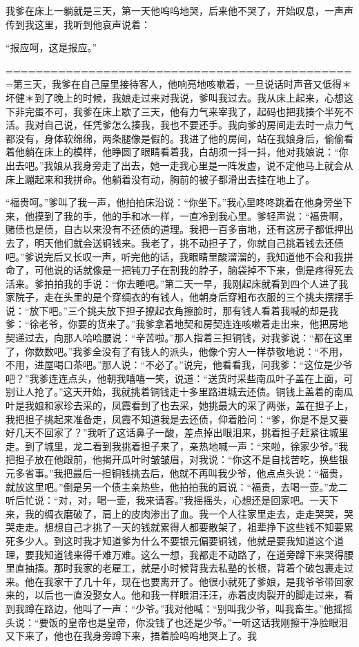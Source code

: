 \documentclass[12pt,UTF8]{ctexbook}
\begin{document}
我爹在床上一躺就是三天，第一天他呜呜地哭，后来他不哭了，开始叹息，一声声传到我这里，我听到他哀声说着：

“报应呵，这是报应。”

===============================================第三天，我爹在自己屋里接待客人，他响亮地咳嗽着，一旦说话时声音又低得＊坏健＊到了晚上的时候，我娘走过来对我说，爹叫我过去。我从床上起来，心想这下非完蛋不可，我爹在床上歇了三天，他有力气来宰我了，起码也把我揍个半死不活。我对自己说，任凭爹怎么揍我，我也不要还手。我向爹的房间走去时一点力气都没有，身体软绵绵，两条腿像是假的。我进了他的房间，站在我娘身后，偷偷看着他躺在床上的模样，他睁圆了眼睛看着我，白胡须一抖一抖，他对我娘说：“你出去吧。”我娘从我身旁走了出去，她一走我心里是一阵发虚，说不定他马上就会从床上蹦起来和我拼命。他躺着没有动，胸前的被子都滑出去挂在地上了。

“福贵呵。”爹叫了我一声，他拍拍床沿说：“你坐下。”我心里咚咚跳着在他身旁坐下来，他摸到了我的手，他的手和冰一样，一直冷到我心里。爹轻声说：“福贵啊，赌债也是债，自古以来没有不还债的道理。我把一百多亩地，还有这房子都低押出去了，明天他们就会送铜钱来。我老了，挑不动担子了，你就自己挑着钱去还债吧。”爹说完后又长叹一声，听完他的话，我眼睛里酸溜溜的，我知道他不会和我拼命了，可他说的话就像是一把钝刀子在割我的脖子，脑袋掉不下来，倒是疼得死去活来。爹拍拍我的手说：“你去睡吧。”第二天一早，我刚起床就看到四个人进了我家院子，走在头里的是个穿绸衣的有钱人，他朝身后穿粗布衣服的三个挑夫摆摆手说：“放下吧。”三个挑夫放下担子撩起衣角擦脸时，那有钱人看着我喊的却是我爹：“徐老爷，你要的货来了。”我爹拿着地契和房契连连咳嗽着走出来，他把房地契递过去，向那人哈哈腰说：“辛苦啦。”那人指着三担铜钱，对我爹说：“都在这里了，你数数吧。”我爹全没有了有钱人的派头，他像个穷人一样恭敬地说：“不用，不用，进屋喝口茶吧。”那人说：“不必了。”说完，他看看我，问我爹：“这位是少爷吧？”我爹连连点头，他朝我嘻嘻一笑，说道：“送货时采些南瓜叶子盖在上面，可别让人抢了。”这天开始，我就挑着铜钱走十多里路进城去还债。铜钱上盖着的南瓜叶是我娘和家珍去采的，凤霞看到了也去采，她挑最大的采了两张，盖在担子上，我把担子挑起来准备走，凤霞不知道我是去还债，仰着脸问：“爹，你是不是又要好几天不回家了？”我听了这话鼻子一酸，差点掉出眼泪来，挑着担子赶紧往城里走。到了城里，龙二看到我挑着担子来了，亲热地喊一声：“来啦，徐家少爷。”我把担子放在他跟前，他揭开瓜叶时皱皱眉，对我说：“你这不是自找苦吃，换些银元多省事。”我把最后一担铜钱挑去后，他就不再叫我少爷，他点点头说：“福贵，就放这里吧。”倒是另一个债主亲热些，他拍拍我的肩说：“福贵，去喝一壶。”龙二听后忙说：“对，对，喝一壶，我来请客。”我摇摇头，心想还是回家吧。一天下来，我的绸衣磨破了，肩上的皮肉渗出了血。我一个人往家里走去，走走哭哭，哭哭走走。想想自己才挑了一天的钱就累得人都要散架了，祖辈挣下这些钱不知要累死多少人。到这时我才知道爹为什么不要银元偏要铜钱，他就是要我知道这个道理，要我知道钱来得千难万难。这么一想，我都走不动路了，在道旁蹲下来哭得腰里直抽搐。那时我家的老雇工，就是小时候背我去私塾的长根，背着个破包裹走过来。他在我家干了几十年，现在也要离开了。他很小就死了爹娘，是我爷爷带回家来的，以后也一直没娶女人。他和我一样眼泪汪汪，赤着皮肉裂开的脚走过来，看到我蹲在路边，他叫了一声：“少爷。”我对他喊：“别叫我少爷，叫我畜生。”他摇摇头说：“要饭的皇帝也是皇帝，你没钱了也还是少爷。”一听这话我刚擦干净脸眼泪又下来了，他也在我身旁蹲下来，捂着脸呜呜地哭上了。我
\end{document}
